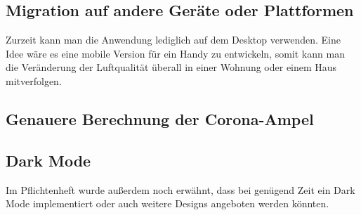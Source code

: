 \documentclass[]{article}
\begin{document}
		\subsection{Migration auf andere Geräte oder Plattformen}
			Zurzeit kann man die Anwendung lediglich auf dem Desktop verwenden. Eine Idee wäre es eine mobile Version für ein Handy zu entwickeln, somit kann man die Veränderung der Luftqualität überall in einer Wohnung oder einem Haus mitverfolgen. 
		\subsection{Genauere Berechnung der Corona-Ampel}
		\subsection{Dark Mode}
			Im Pflichtenheft wurde außerdem noch erwähnt, dass bei genügend Zeit ein Dark Mode implementiert oder auch weitere Designs angeboten werden könnten. 	
		
		
\newpage
\printbibliography
\end{document}
